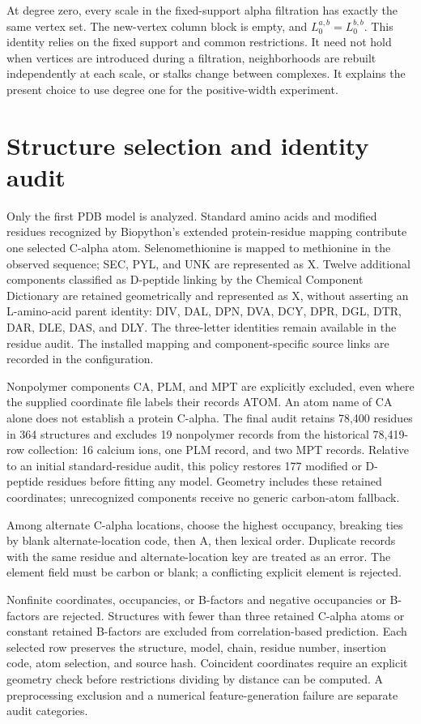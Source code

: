 \documentclass[10pt]{article}
\begin{document}
At degree zero, every scale in the fixed-support alpha filtration has exactly the same vertex set. The new-vertex column block is empty, and $L_0^{a,b}=L_0^{b,b}$. This identity relies on the fixed support and common restrictions. It need not hold when vertices are introduced during a filtration, neighborhoods are rebuilt independently at each scale, or stalks change between complexes. It explains the present choice to use degree one for the positive-width experiment.

\section{Structure selection and identity audit}
Only the first PDB model is analyzed. Standard amino acids and modified residues recognized by Biopython's extended protein-residue mapping contribute one selected C-alpha atom. Selenomethionine is mapped to methionine in the observed sequence; SEC, PYL, and UNK are represented as X. Twelve additional components classified as D-peptide linking by the Chemical Component Dictionary \citep{ccd} are retained geometrically and represented as X, without asserting an L-amino-acid parent identity: DIV, DAL, DPN, DVA, DCY, DPR, DGL, DTR, DAR, DLE, DAS, and DLY. The three-letter identities remain available in the residue audit. The installed mapping and component-specific source links are recorded in the configuration.

Nonpolymer components CA, PLM, and MPT are explicitly excluded, even where the supplied coordinate file labels their records ATOM. An atom name of CA alone does not establish a protein C-alpha. The final audit retains 78,400 residues in 364 structures and excludes 19 nonpolymer records from the historical 78,419-row collection: 16 calcium ions, one PLM record, and two MPT records. Relative to an initial standard-residue audit, this policy restores 177 modified or D-peptide residues before fitting any model. Geometry includes these retained coordinates; unrecognized components receive no generic carbon-atom fallback.

Among alternate C-alpha locations, choose the highest occupancy, breaking ties by blank alternate-location code, then A, then lexical order. Duplicate records with the same residue and alternate-location key are treated as an error. The element field must be carbon or blank; a conflicting explicit element is rejected.

Nonfinite coordinates, occupancies, or B-factors and negative occupancies or B-factors are rejected. Structures with fewer than three retained C-alpha atoms or constant retained B-factors are excluded from correlation-based prediction. Each selected row preserves the structure, model, chain, residue number, insertion code, atom selection, and source hash. Coincident coordinates require an explicit geometry check before restrictions dividing by distance can be computed. A preprocessing exclusion and a numerical feature-generation failure are separate audit categories.
\end{document}
